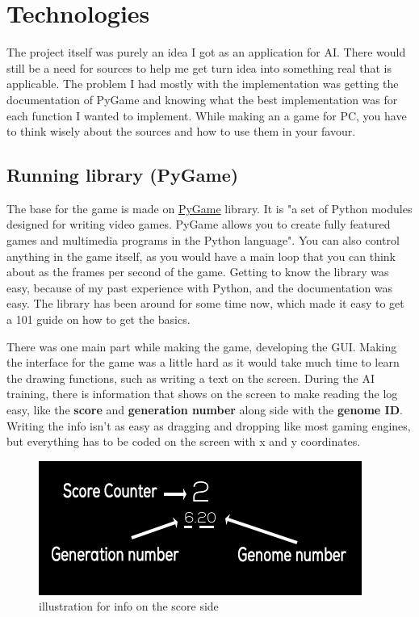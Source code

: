 \chapter{Technologies}

The project itself was purely an idea I got as an application for AI. There would still be a need for sources to help me get turn idea into something real that is applicable. The problem I had mostly with the implementation was getting the documentation of PyGame and knowing what the best implementation was for each function I wanted to implement. While making an a game for PC, you have to think wisely about the sources and how to use them in your favour.

\section{ Running library (PyGame)}
The base for the game is made on \href{(https://www.pygame.org/wiki/about}{PyGame} library. It is "a set of Python modules designed for writing video games. PyGame allows you to create fully featured games and multimedia programs in the Python language". You can also control anything in the game itself, as you would have a main loop that you can think about as the frames per second of the game. Getting to know the library was easy, because of my past experience with Python, and the documentation was easy. The library has been around for some time now, which made it easy to get a 101 guide on how to get the basics.



There was one main part while making the game, developing the GUI. Making the interface for the game was a little hard as it would take much time to learn the drawing functions, such as writing a text on the screen. During the AI training, there is information that shows on the screen to make reading the log easy, like the \textbf{score} and \textbf{generation number} along side with the \textbf{genome ID}. Writing the info isn’t as easy as dragging and dropping like most gaming engines, but everything has to be coded on the screen with x and y coordinates.
\begin{figure}[H]
	\centering
	\includegraphics[width=0.7\linewidth]{usedImages/scoreFrame}
	\caption{illustration for info on the score side	}
	\label{fig:scoreframe}
\end{figure}

